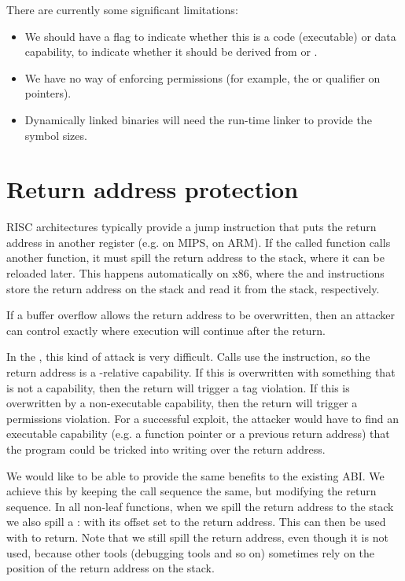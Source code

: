There are currently some significant limitations:

\begin{itemize}
	\item We should have a flag to indicate whether this is a code (executable) or data capability, to indicate whether it should be derived from  or .
	\item We have no way of enforcing permissions (for example, the  or  qualifier on pointers).
	\item Dynamically linked binaries will need the run-time linker to provide the symbol sizes.
\end{itemize}

\section{Return address protection}

RISC architectures typically provide a jump instruction that puts the return address in another register (e.g.  on MIPS,  on ARM).
If the called function calls another function, it must spill the return address to the stack, where it can be reloaded later.
This happens automatically on x86, where the  and  instructions store the return address on the stack and read it from the stack, respectively.

If a buffer overflow allows the return address to be overwritten, then an attacker can control exactly where execution will continue after the return.

In the \sandboxABI{}, this kind of attack is very difficult.
Calls use the  instruction, so the return address is a -relative capability.
If this is overwritten with something that is not a capability, then the return will trigger a tag violation.
If this is overwritten by a non-executable capability, then the return will trigger a permissions violation.
For a successful exploit, the attacker would have to find an executable capability (e.g. a function pointer or a previous return address) that the program could be tricked into writing over the return address.

We would like to be able to provide the same benefits to the existing ABI.
We achieve this by keeping the call sequence the same, but modifying the return sequence.
In all non-leaf functions, when we spill the return address to the stack we also spill a :  with its offset set to the return address.
This can then be used with  to return.
Note that we still spill the return address, even though it is not used, because other tools (debugging tools and so on) sometimes rely on the position of the return address on the stack.


